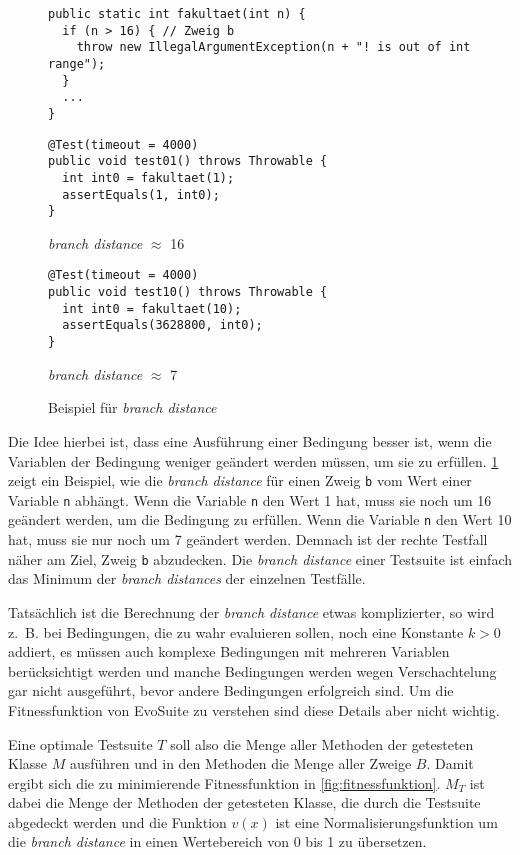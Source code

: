 \documentclass[a4paper,11pt]{article}
\begin{document}
\begin{figure}[h]
	\begin{lstlisting}[basicstyle=\ttfamily\tiny]
public static int fakultaet(int n) {
  if (n > 16) { // Zweig b
    throw new IllegalArgumentException(n + "! is out of int range");
  }
  ...
}
	\end{lstlisting}
	\begin{multicols}{2}
		\begin{lstlisting}[basicstyle=\ttfamily\tiny]
@Test(timeout = 4000)
public void test01() throws Throwable {
  int int0 = fakultaet(1);
  assertEquals(1, int0);
}
		\end{lstlisting}
		\textit{branch distance} $\approx$ 16
		\columnbreak
		\begin{lstlisting}[basicstyle=\ttfamily\tiny]
@Test(timeout = 4000)
public void test10() throws Throwable {
  int int0 = fakultaet(10);
  assertEquals(3628800, int0);
}
		\end{lstlisting}
		\textit{branch distance} $\approx$ 7
	\end{multicols}
	\caption{Beispiel für \textit{branch distance}}
	\label{fig:branch_distance}
\end{figure}

Die Idee hierbei ist, dass eine Ausführung einer Bedingung besser ist, wenn die Variablen der Bedingung weniger geändert werden müssen, um sie zu erfüllen.
\cref{fig:branch_distance} zeigt ein Beispiel, wie die \textit{branch distance} für einen Zweig \texttt{b} vom Wert einer Variable \texttt{n} abhängt.
Wenn die Variable \texttt{n} den Wert 1 hat, muss sie noch um 16 geändert werden, um die Bedingung zu erfüllen.
Wenn die Variable \texttt{n} den Wert 10 hat, muss sie nur noch um 7 geändert werden.
Demnach ist der rechte Testfall näher am Ziel, Zweig \texttt{b} abzudecken.
Die \textit{branch distance} einer Testsuite ist einfach das Minimum der \textit{branch distances} der einzelnen Testfälle.

Tatsächlich ist die Berechnung der \textit{branch distance} etwas komplizierter, so wird z.~B. bei Bedingungen, die zu wahr evaluieren sollen, noch eine Konstante $k > 0$ addiert, es müssen auch komplexe Bedingungen mit mehreren Variablen berücksichtigt werden und manche Bedingungen werden wegen Verschachtelung gar nicht ausgeführt, bevor andere Bedingungen erfolgreich sind.
Um die Fitnessfunktion von EvoSuite zu verstehen sind diese Details aber nicht wichtig.

Eine optimale Testsuite $T$ soll also die Menge aller Methoden der getesteten Klasse $M$ ausführen und in den Methoden die Menge aller Zweige $B$.
Damit ergibt sich die zu minimierende Fitnessfunktion in \cref{fig:fitnessfunktion}.
$M_T$ ist dabei die Menge der Methoden der getesteten Klasse, die durch die Testsuite abgedeckt werden und die Funktion $v(x)$ ist eine Normalisierungsfunktion um die \textit{branch distance} in einen Wertebereich von 0 bis 1 zu übersetzen.
\end{document}
